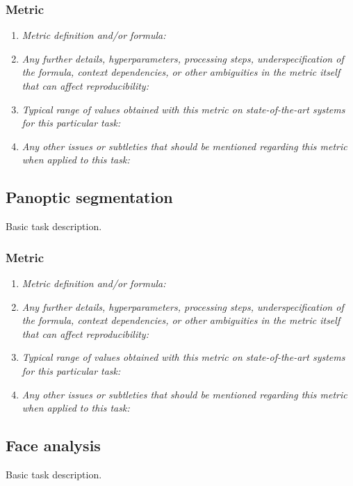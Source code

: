 \documentclass[a4paper,11pt]{article}
\begin{document}
    \subsubsection{Metric}
        \begin{enumerate}[label=\alph*.]
            \item \textit{Metric definition and/or formula:}
            \bigskip
            \item \textit{Any further details, hyperparameters, processing steps, underspecification of the formula, context dependencies, or other ambiguities in the metric itself that can affect reproducibility:}
            \bigskip
            \item \textit{Typical range of values obtained with this metric on state-of-the-art systems for this particular task:}
            \bigskip
            \item \textit{Any other issues or subtleties that should be mentioned regarding this metric when applied to this task:}
            \bigskip
        \end{enumerate}

\subsection{Panoptic segmentation}
    Basic task description.
    \subsubsection{Metric}
        \begin{enumerate}[label=\alph*.]
            \item \textit{Metric definition and/or formula:}
            \bigskip
            \item \textit{Any further details, hyperparameters, processing steps, underspecification of the formula, context dependencies, or other ambiguities in the metric itself that can affect reproducibility:}
            \bigskip
            \item \textit{Typical range of values obtained with this metric on state-of-the-art systems for this particular task:}
            \bigskip
            \item \textit{Any other issues or subtleties that should be mentioned regarding this metric when applied to this task:}
            \bigskip
        \end{enumerate}

\subsection{Face analysis} \label{face_analysis}
    Basic task description.
\end{document}
